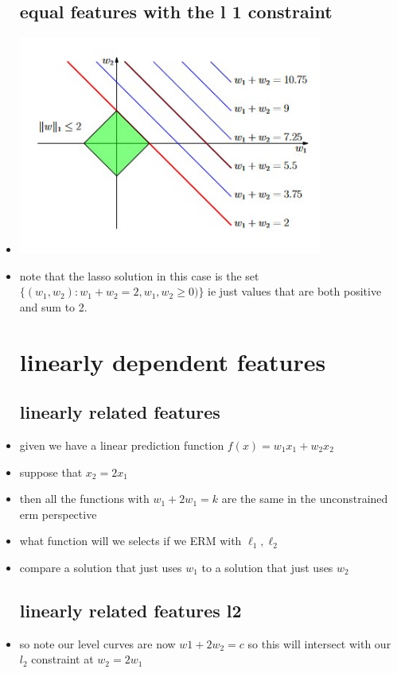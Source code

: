 \documentclass{article}
\begin{document}
\begin{itemize}
\subsection{equal features with the l  1 constraint}
\item \includegraphics[width=10cm]{labs/lab_3/images/r3_3.jpg}
\item note that the lasso solution in this case is the set $\{ (w_1,w_2): w_1+w_2=2, w_1,w_2\geq 0)\}$ ie just values that are both positive and sum to 2. 
\section{linearly dependent features}
\subsection{linearly related features}
\item given we have a linear prediction function $f(x)=w_1x_1+w_2x_2$
\item suppose that $x_2=2x_1$
\item then all the functions with $w_1+2w_1=k$ are the same in the unconstrained erm perspective
\item what function will we selects if we ERM with $\ell_{1},\ell_{2}$
\item compare a solution that just uses $w_1$ to a solution that just uses $w_2$
\subsection{linearly related features l2}
\item so note our level curves are now $w1+2w_2=c$ so this will intersect with our $l_2$ constraint at $w_2=2w_1$

\end{itemize}
\end{document}
